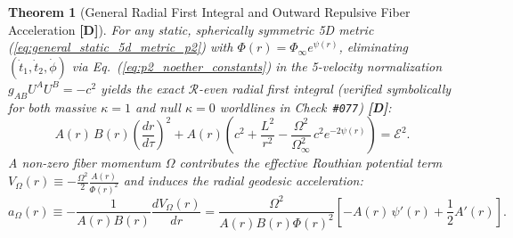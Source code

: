 \documentclass[11pt,a4paper]{article}
\newcommand{\catD}{\textbf{\textcolor{blue!75!black}{[D]}}}
\theoremstyle{plain}
\newtheorem{theorem}{Theorem}[section]
\theoremstyle{definition}
\theoremstyle{remark}
\numberwithin{equation}{section}
\begin{document}
\begin{theorem}[General Radial First Integral and Outward Repulsive Fiber Acceleration \catD]
\label{thm:general_geodesic_repulsion}
For any static, spherically symmetric 5D metric (\ref{eq:general_static_5d_metric_p2}) with $\Phi(r) = \Phi_{\infty}e^{\psi(r)}$, eliminating $(\dot{t}_1, \dot{t}_2, \dot{\phi})$ via Eq.~(\ref{eq:p2_noether_constants}) in the 5-velocity normalization $g_{AB}U^A U^B = -c^2$ yields the exact $\mathcal{R}$-even radial first integral (verified symbolically for both massive $\kappa = 1$ and null $\kappa = 0$ worldlines in Check~\texttt{\#077}) \catD:
\begin{equation}
  A(r)\,B(r)\left(\frac{dr}{d\tau}\right)^2 + A(r)\left(c^2 + \frac{L^2}{r^2} - \frac{\Omega^2}{\Omega_{\infty}^2}\,c^2 e^{-2\psi(r)}\right) = \mathcal{E}^2.
  \label{eq:p2_general_first_integral}
\end{equation}
A non-zero fiber momentum $\Omega$ contributes the effective Routhian potential term $V_{\Omega}(r) \equiv -\frac{\Omega^2}{2}\frac{A(r)}{\Phi(r)^2}$ and induces the radial geodesic acceleration:
\begin{equation}
  a_{\Omega}(r) \equiv -\frac{1}{A(r)B(r)}\frac{dV_{\Omega}(r)}{dr} = \frac{\Omega^2}{A(r)B(r)\Phi(r)^2}\left[-A(r)\,\psi'(r) + \frac{1}{2}A'(r)\right].
  \label{eq:p2_general_a_omega}
\end{equation}

\end{theorem}
\end{document}

